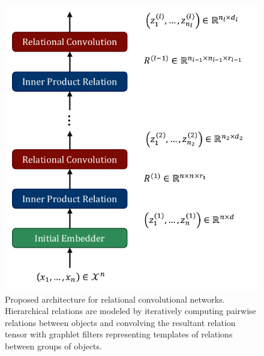 \begin{figure}
    \centering
    \includegraphics[width=.48\textwidth]{figs/relconv_architecture.pdf}
    \caption{Proposed architecture for relational convolutional networks. Hierarchical relations are modeled by iteratively computing pairwise relations between objects and convolving the resultant relation tensor with graphlet filters representing templates of relations between groups of objects.
    }\label{fig:relconv_architecture}
    \vskip-24pt
\end{figure}



